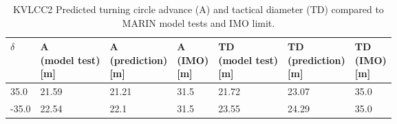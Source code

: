 \renewcommand{\cellalign}{vh}
\renewcommand{\theadalign}{vh}
\begin{table}[h]
    \centering
    \footnotesize
        \caption{KVLCC2 Predicted turning circle advance (A) and tactical diameter (TD) compared to MARIN model tests and IMO limit.}
    \label{\detokenize{06.20_results_kvlcc2:tab-kvlcc2-advance}}
    \begin{tabular}{p{0.7cm} p{1.5cm} p{1.3cm} p{1.0cm} p{1.3cm} p{1.3cm} p{1.0cm} }
\toprule
\sphinxstyletheadfamily 

$\delta$
&\sphinxstyletheadfamily 

\thead{A \\ (model test) \\ {[}m{]}}
&\sphinxstyletheadfamily 

\thead{A \\ (prediction) \\ {[}m{]}}
&\sphinxstyletheadfamily 

\thead{A \\ (IMO) \\ {[}m{]}}
&\sphinxstyletheadfamily 

\thead{TD \\ (model test) \\ {[}m{]}}
&\sphinxstyletheadfamily 

\thead{TD \\ (prediction) \\ {[}m{]}}
&\sphinxstyletheadfamily 

\thead{TD \\ (IMO) \\ {[}m{]}}
\\
\hline

35.0
&

21.59
&

21.21
&

31.5
&

21.72
&

23.07
&

35.0
\\


-35.0
&

22.54
&

22.1
&

31.5
&

23.55
&

24.29
&

35.0
\\
\bottomrule
\end{tabular}
\end{table}
